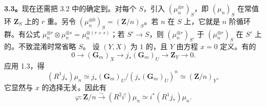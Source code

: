 \textbf{3.3。}现在还需把 3.2 中的确定到。对每个 $S$，引入 $(\mu_n^{\otimes r})_S$，即 $(\mu_n)_S$ 在常值环 $\mathbf Z_S$ 上的 $r$ 重。另令 $(\mu_n^{\otimes0})_S=(\mathbf Z/n)_S$。若 $n$ 在 $S$ 上，它就是 $n$ 阶循环群。有公式 $\mu_n^{\otimes r}\otimes\mu_n^{\otimes s}=\mu_n^{\otimes(r+s)}$；若 $S'\to S$，则 $(\mu_n^{\otimes r})_{S'}$ 于 $(\mu_n^{\otimes r})_S$ 在 $S'$ 上的。不致混淆时常省略 $S$。
设 $(Y,X)$ 为 $1$ 的，且 $Y$ 由方程 $x=0$ 定义。有的
\[0\longrightarrow(\mathbf G_m)_X\longrightarrow j_*(\mathbf G_m)_U\longrightarrow\mathbf Z_Y\longrightarrow0.\]
应用 1.3，得
\[(R^1j_*)\mu_n\simeq j_*(\mathbf G_m)_U/(j_*(\mathbf G_m)_U)^n\simeq(\mathbf Z/n)_Y,\tag{3.3.1}\]
它显然与 $x$ 的选择无关。因此有
\[\varphi:\mathbf Z/n\xrightarrow{\sim}(R^2i^!)\mu_n\simeq i^*(R^1j_*)\mu_n.\tag{3.3.2}\]
